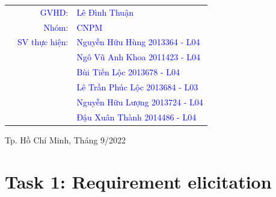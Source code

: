 \documentclass[a4paper]{article}
\begin{document}
\begin{titlepage}
\begin{table}[h]
\begin{tabular}{rrl}

\hspace{5 cm} &\textcolor{blue}{ GVHD}: & \textcolor{blue}{Lê Đình Thuận}\\
\hspace{5 cm} &\textcolor{blue}{ Nhóm}: & \textcolor{blue}{CNPM}\\
& \textcolor{blue}{SV thực hiện}: & \textcolor{blue}{Nguyễn Hữu Hùng \hspace{6.5mm}2013364 - L04} \\
& &\textcolor{blue}{Ngô Vũ Anh Khoa  \hspace{6.5mm}2011423 - L04} \\
& & \textcolor{blue}{Bùi Tiến Lộc \hspace{15mm}2013678 - L04}  \\
& &\textcolor{blue}{Lê Trần Phúc Lộc  \hspace{7.5mm}2013684 - L03} \\
& & \textcolor{blue}{Nguyễn Hữu Lượng \hspace{5.5mm}2013724 - L04} \\
& &\textcolor{blue}{Đậu Xuân Thành  \hspace{8.5mm}2014486 - L04}  \\

\end{tabular}
\end{table}
\vspace{5cm}
\begin{center}
{\footnotesize Tp. Hồ Chí Minh, Tháng 9/2022}
\end{center}
\end{titlepage}



\newpage
\tableofcontents
\newpage
\section{Task 1: Requirement elicitation}
\end{document}
